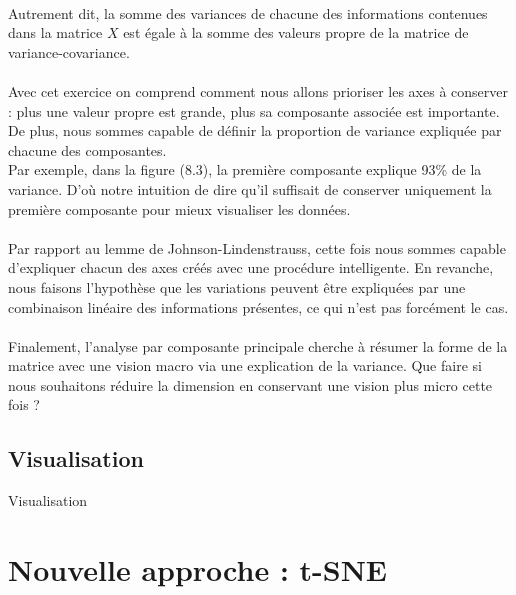                     \\
                    Autrement dit, la somme des variances de chacune des informations contenues dans la matrice $X$ est égale à la somme des valeurs propre de la matrice de variance-covariance.
                    \\
                    \\
                    Avec cet exercice on comprend comment nous allons prioriser les axes à conserver : plus une valeur propre est grande, plus sa composante associée est importante. De plus, nous sommes capable de définir la proportion de variance expliquée par chacune des composantes.
                    \\
                    Par exemple, dans la figure (8.3), la première composante explique 93\% de la variance. D’où notre intuition de dire qu’il suffisait de conserver uniquement la première composante pour mieux visualiser les données.
                    \\
                    \\
                    Par rapport au lemme de Johnson-Lindenstrauss, cette fois nous sommes capable d’expliquer chacun des axes créés avec une procédure intelligente. En revanche, nous faisons l’hypothèse que les variations peuvent être expliquées par une combinaison linéaire des informations présentes, ce qui n’est pas forcément le cas.
                    \\
                    \\
                    Finalement, l’analyse par composante principale cherche à résumer la forme de la matrice avec une vision macro via une explication de la variance. Que faire si nous souhaitons réduire la dimension en conservant une vision plus micro cette fois ?


        \newpage





        \subsection{Visualisation}
        Visualisation


        \newpage








    \section{Nouvelle approche : t-SNE}
